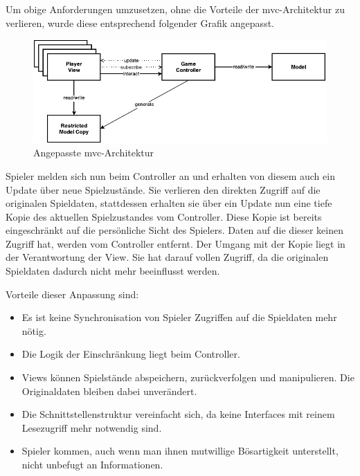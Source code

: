 \documentclass[
							a4paper, 
							11pt, 
							openany, 
							liststotoc,
							parskip=half, 
   							headings=normal
						]{scrreprt}
\begin{document}
{Um obige Anforderungen umzusetzen, ohne die Vorteile der \acs{mvc}-Architektur zu verlieren, wurde diese entsprechend folgender Grafik angepasst.
\begin{figure}[H]
\begin{center}
    \includegraphics[width=1.0\textwidth]{./pictures/custom_mvc.pdf}
	\caption[Anwendung -- Angepasste \acs{mvc}-Architektur]{Angepasste \acs{mvc}-Architektur} \label{fig:mvc_custom_mvc}
\end{center}
\end{figure}
Spieler melden sich nun beim Controller an und erhalten von diesem auch ein Update über neue Spielzustände. Sie verlieren den direkten Zugriff auf die originalen Spieldaten, stattdessen erhalten sie über ein Update nun eine tiefe Kopie des aktuellen Spielzustandes  vom Controller. Diese Kopie ist bereits eingeschränkt auf die persönliche Sicht des Spielers. Daten auf die dieser keinen Zugriff hat, werden vom Controller entfernt. Der Umgang mit der Kopie liegt in der Verantwortung der View. Sie hat darauf vollen Zugriff, da die originalen Spieldaten dadurch nicht mehr beeinflusst werden.

\clearpage

Vorteile dieser Anpassung sind:
\begin{itemize}
	\item Es ist keine Synchronisation von Spieler Zugriffen auf die Spieldaten mehr nötig.
	\item Die Logik der Einschränkung liegt beim Controller.
	\item Views können Spielstände abspeichern, zurückverfolgen und manipulieren. Die Originaldaten bleiben dabei unverändert.
	\item Die Schnittstellenstruktur vereinfacht sich, da keine Interfaces mit reinem Lesezugriff mehr notwendig sind.
	\item Spieler kommen, auch wenn man ihnen mutwillige Bösartigkeit unterstellt, nicht unbefugt an Informationen.
\end{itemize}

}
\end{document}
